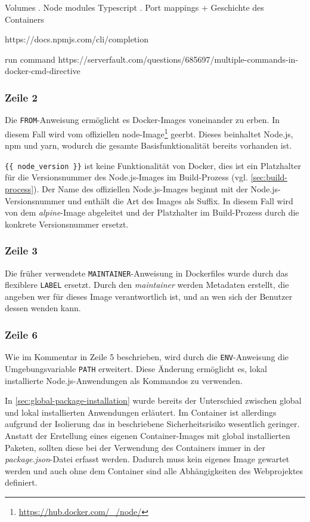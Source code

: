 Volumes
. Node modules Typescript
. Port mappings + Geschichte des Containers

https://docs.npmjs.com/cli/completion

run command
https://serverfault.com/questions/685697/multiple-commands-in-docker-cmd-directive

\subsubsection{Zeile 2}
Die \verb|FROM|-Anweisung ermöglicht es Docker-Images voneinander zu erben.
In diesem Fall wird vom offiziellen node-Image\footnote{\url{https://hub.docker.com/_/node/}} geerbt.
Dieses beinhaltet Node.js, npm und yarn, wodurch die gesamte Basisfunktionalität bereits vorhanden ist.

\verb|{{ node_version }}| ist keine Funktionalität von Docker, dies ist ein Platzhalter für die Versionsnummer des Node.js-Images im Build-Prozess (vgl. \cref{sec:build-process}).
Der Name des offiziellen Node.js-Images beginnt mit der Node.js-Versionsnummer und enthält die Art des Images als Suffix.
In diesem Fall wird von dem \emph{alpine}-Image abgeleitet und der Platzhalter im Build-Prozess durch die konkrete Versionsnummer ersetzt.

\subsubsection{Zeile 3}
Die früher verwendete \verb|MAINTAINER|-Anweisung in Dockerfiles wurde durch das flexiblere \verb|LABEL| ersetzt.
Durch den \emph{maintainer} werden Metadaten erstellt, die angeben wer für dieses Image verantwortlich ist, und an wen sich der Benutzer dessen wenden kann.

\subsubsection{Zeile 6}
Wie im Kommentar in Zeile 5 beschrieben, wird durch die \verb|ENV|-Anweisung die Umgebungsvariable \verb|PATH| erweitert.
Diese Änderung ermöglicht es, lokal installierte Node.js-Anwendungen als Kommandos zu verwenden.

In \cref{sec:global-package-installation} wurde bereits der Unterschied zwischen global und lokal installierten Anwendungen erläutert.
Im Container ist allerdings aufgrund der Isolierung das in \autocite{stackoverflow:nodemodules-hack:online} beschriebene Sicherheitsrisiko wesentlich geringer.
Anstatt der Erstellung eines eigenen Container-Images mit global installierten Paketen, sollten diese bei der Verwendung des Containers immer in der \emph{package.json}-Datei erfasst werden.
Dadurch muss kein eigenes Image gewartet werden und auch ohne dem Container sind alle Abhängigkeiten des Webprojektes definiert.

